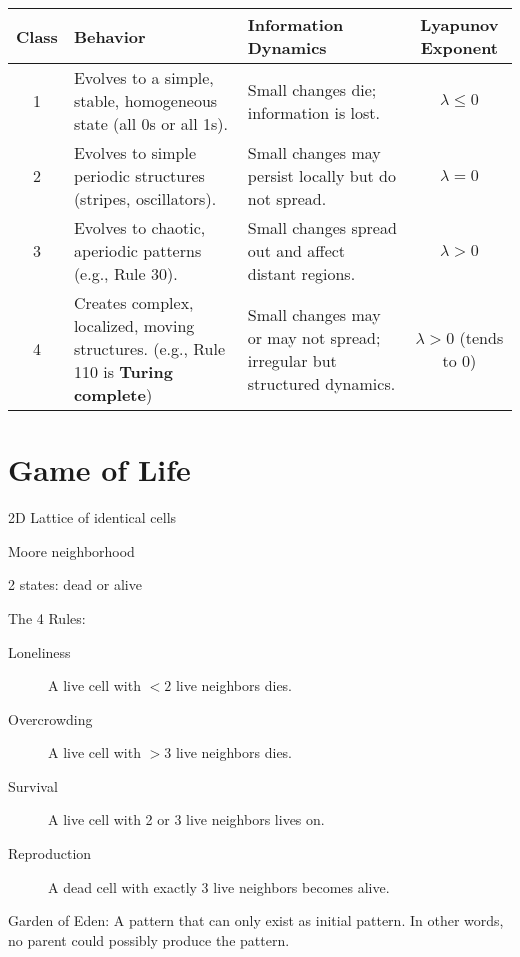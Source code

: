 \renewcommand{\arraystretch}{1.3}
\begin{table}[h!]
\centering
\begin{tabular}{|c|p{4cm}|p{4cm}|c|}
\hline
\textbf{Class} & \textbf{Behavior} & \textbf{Information Dynamics} & \textbf{Lyapunov Exponent} \\
\hline
1 & Evolves to a simple, stable, homogeneous state (all 0s or all 1s). & Small changes die; information is lost. & $\lambda \le 0$ \\
\hline
2 & Evolves to simple periodic structures (stripes, oscillators). & Small changes may persist locally but do not spread. & $\lambda = 0$ \\
\hline
3 & Evolves to chaotic, aperiodic patterns (e.g., Rule 30). & Small changes spread out and affect distant regions. & $\lambda > 0$ \\
\hline
4 & Creates complex, localized, moving structures. (e.g., Rule 110 is \textbf{Turing complete}) & Small changes may or may not spread; irregular but structured dynamics. & $\lambda > 0$ (tends to 0) \\
\hline
\end{tabular}
\end{table}

\section*{Game of Life}

\begin{tightitemize}
    \item 2D Lattice of identical cells
    \item Moore neighborhood
    \item 2 states: dead or alive
    \item The 4 Rules:
    \begin{description}
        \item[Loneliness] A live cell with $<2$ live neighbors dies.
        \item[Overcrowding] A live cell with $>3$ live neighbors dies.
        \item[Survival] A live cell with 2 or 3 live neighbors lives on.
        \item[Reproduction] A dead cell with exactly 3 live neighbors becomes alive.
    \end{description}
    \item Garden of Eden: A pattern that can only exist as initial pattern. In other
words, no parent could possibly produce the pattern.
\end{tightitemize}
